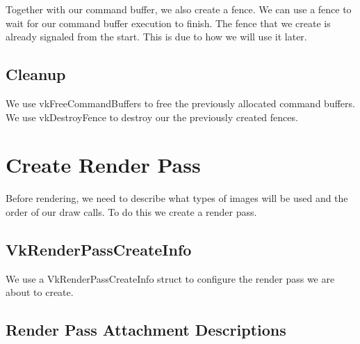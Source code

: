 Together with our command buffer, we also create a fence.
We can use a fence to wait for our command buffer execution to finish.
The fence that we create is already signaled from the start.
This is due to how we will use it later.

\begin{minipage}{\linewidth}{\noindent}
    
\end{minipage}

\subsection{Cleanup}

We use vkFreeCommandBuffers to free the previously allocated command buffers.
We use vkDestroyFence to destroy our the previously created fences.

\section{Create Render Pass}

Before rendering, we need to describe what types of images will be used and the
order of our draw calls.
To do this we create a render pass.

\begin{minipage}{\linewidth}{\noindent}
    
\end{minipage}

\subsection{VkRenderPassCreateInfo}

We use a VkRenderPassCreateInfo struct to configure the render pass we
are about to create.

\begin{minipage}{\linewidth}{\noindent}
    
\end{minipage}

\subsection{Render Pass Attachment Descriptions}

